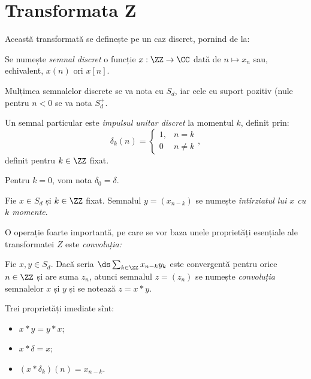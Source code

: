 
\chapter{Transformata Z}

Această transformată se definește pe un caz discret, pornind de la:
\begin{definition}\label{def:semnal}
    Se numește \emph{semnal discret} o funcție $ x : \ZZ \to \CC $ dată
    de $ n \mapsto x_n $ sau, echivalent, $ x(n) $ ori $ x[n] $.
\end{definition}

Mulțimea semnalelor discrete se va nota cu $ S_d $, iar cele cu suport pozitiv
(nule pentru $ n < 0 $ se va nota $ S_d^+ $.

Un semnal particular este \emph{impulsul unitar discret} la momentul $ k $,
definit prin:
\[
    \delta_k(n) = \begin{cases} 1, & n = k \\ 0 & n \neq k \end{cases},
\]
definit pentru $ k \in \ZZ $ fixat.

Pentru $ k = 0 $, vom nota $ \delta_0 = \delta $.

\begin{definition}\label{def:intirziat} 
    Fie $ x \in S_d $ și $ k \in \ZZ $ fixat. Semnalul $ y = (x_{n-k}) $ se numește
    \emph{întîrziatul lui $ x $ cu $ k $ momente}.
\end{definition}

O operație foarte importantă, pe care se vor baza unele proprietăți esențiale ale
transformatei $ Z $ este \emph{convoluția:} 
\begin{definition}\label{def:convolutie}
    Fie $ x, y \in S_d $. Dacă seria $ \ds\sum_{k \in \ZZ} x_{n-k} y_k $
    este convergentă pentru orice $ n \in \ZZ $ și are suma $ z_n $, atunci semnalul
    $ z = (z_n) $ se numește \emph{convoluția} semnalelor $ x $ și $ y $ și
    se notează $ z = x \ast y $.
\end{definition}

Trei proprietăți imediate sînt:
\begin{itemize}
    \item $ x \ast y = y \ast x $;
    \item $ x \ast \delta = x $;
    \item $ (x \ast \delta_k)(n) = x_{n - k} $.
\end{itemize}

